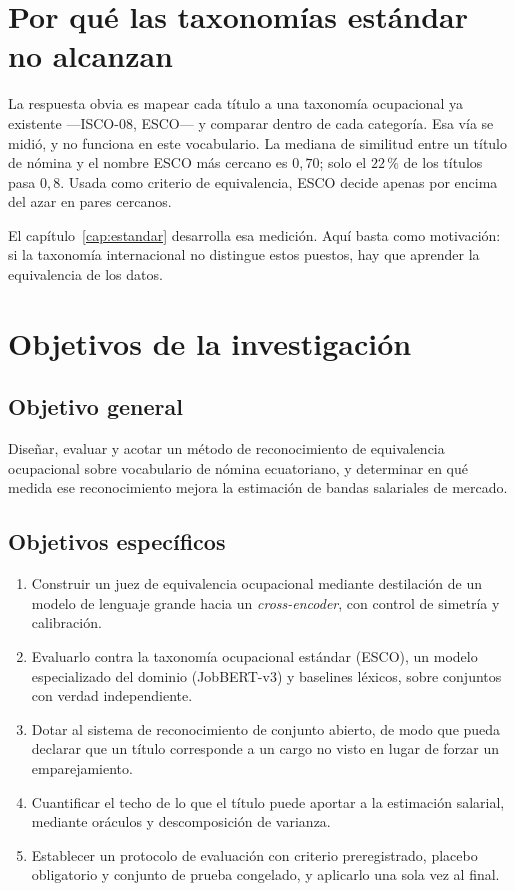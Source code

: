 \documentclass[12pt,a4paper,oneside]{report}
\begin{document}
\section{Por qué las taxonomías estándar no alcanzan}

La respuesta obvia es mapear cada título a una taxonomía ocupacional ya existente ---ISCO-08,
ESCO--- y comparar dentro de cada categoría. Esa vía se midió, y no funciona en este
vocabulario. La mediana de similitud entre un título de nómina y el nombre ESCO más
cercano es $0{,}70$; solo el $22\,\%$ de los títulos pasa $0{,}8$.
Usada como criterio de equivalencia, ESCO decide apenas por encima del azar en pares
cercanos.

El capítulo~\ref{cap:estandar} desarrolla esa medición. Aquí basta como motivación: si la
taxonomía internacional no distingue estos puestos, hay que aprender la equivalencia de
los datos.

\section{Objetivos de la investigación}

\subsection*{Objetivo general}

Diseñar, evaluar y acotar un método de reconocimiento de equivalencia ocupacional sobre
vocabulario de nómina ecuatoriano, y determinar en qué medida ese reconocimiento mejora la
estimación de bandas salariales de mercado.

\subsection*{Objetivos específicos}

\begin{enumerate}[nosep,leftmargin=2em]
  \item Construir un juez de equivalencia ocupacional mediante destilación de un modelo de
    lenguaje grande hacia un \emph{cross-encoder}, con control de simetría y calibración.
  \item Evaluarlo contra la taxonomía ocupacional estándar (ESCO), un modelo especializado
    del dominio (JobBERT-v3) y baselines léxicos, sobre conjuntos con verdad independiente.
  \item Dotar al sistema de reconocimiento de conjunto abierto, de modo que pueda declarar
    que un título corresponde a un cargo no visto en lugar de forzar un emparejamiento.
  \item Cuantificar el techo de lo que el título puede aportar a la estimación salarial,
    mediante oráculos y descomposición de varianza.
  \item Establecer un protocolo de evaluación con criterio preregistrado, placebo
    obligatorio y conjunto de prueba congelado, y aplicarlo una sola vez al final.
\end{enumerate}
\end{document}
